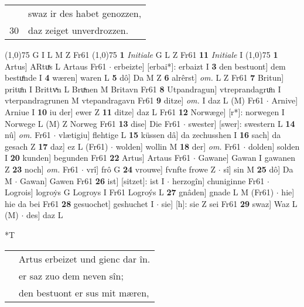 \documentclass[8pt,a4paper,notitlepage]{article}
\begin{document}
\begin{table}[ht]
\begin{minipage}[t]{0.5\linewidth}
\begin{tabular}{rl}
 & swaz ir des habet genozzen,\\ 
30 & daz zeiget unverdrozzen.\\ 
\end{tabular}
\scriptsize
\line(1,0){75} \newline
G I L M Z Fr61 \newline
\line(1,0){75} \newline
\textbf{1} \textit{Initiale} G L Z Fr61  \textbf{11} \textit{Initiale} I  \newline
\line(1,0){75} \newline
\textbf{1} Artus] ARtuͯs L Artaus Fr61  $\cdot$ erbeizte] [erbai*]: erbaizt I \textbf{3} den bestuont] dem bestuͤnde I \textbf{4} wæren] waren L \textbf{5} dô] Da M Z \textbf{6} alrêrst] \textit{om.} L Z Fr61 \textbf{7} Britun] prituͦn I Brittvͯn L Bruͯnen M Britavn Fr61 \textbf{8} Utpandragun] vtreprandagruͦn I vterpandragrunen M vtepandragavn Fr61 \textbf{9} ditze] \textit{om.} I daz L (M) Fr61  $\cdot$ Arnive] Arniue I \textbf{10} iu der] ewer Z \textbf{11} ditze] daz L Fr61 \textbf{12} Norwæge] [r*]: norwegen I Norwege L (M) Z Norweg Fr61 \textbf{13} dise] Die Fr61  $\cdot$ swester] [swer]: swestern L \textbf{14} nû] \textit{om.} Fr61  $\cdot$ vlætigiu] flehtige L \textbf{15} küssen dâ] da zechusshen I \textbf{16} sach] da gesach Z \textbf{17} daz] ez L (Fr61)  $\cdot$ wolden] wollin M \textbf{18} der] \textit{om.} Fr61  $\cdot$ dolden] solden I \textbf{20} kunden] begunden Fr61 \textbf{22} Artus] Artaus Fr61  $\cdot$ Gawane] Gawan I gawanen Z \textbf{23} noch] \textit{om.} Fr61  $\cdot$ vrî] frô G \textbf{24} vrouwe] fvnfte frowe Z  $\cdot$ sî] sin M \textbf{25} dô] Da M  $\cdot$ Gawan] Gawen Fr61 \textbf{26} ist] [sitzet]: ist I  $\cdot$ herzogîn] chuniginne Fr61  $\cdot$ Logrois] logroẏs G Logroys I Fr61 Logroýs L \textbf{27} gnâden] gnade L M (Fr61)  $\cdot$ hie] hie da bei Fr61 \textbf{28} gesuochet] geshuchet I  $\cdot$ sie] [h]: sie Z sei Fr61 \textbf{29} swaz] Waz L (M)  $\cdot$ des] daz L \newline
\end{minipage}
\hspace{0.5cm}
\begin{minipage}[t]{0.5\linewidth}
\small
\begin{center}*T
\end{center}
\begin{tabular}{rl}
 & Artus erbeizet und gienc dar în.\\ 
 & er saz zuo dem neven sîn;\\ 
 & den bestuont er sus mit mæren,\\ 

\end{tabular}
\end{minipage}
\end{table}
\end{document}
